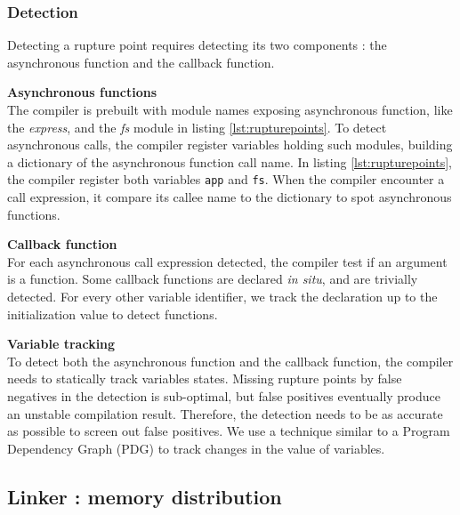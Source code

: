 \subsubsection{Detection}

Detecting a rupture point requires detecting its two components : the asynchronous function and the callback function.

\textbf{Asynchronous functions}\\
The compiler is prebuilt with module names exposing asynchronous function, like the \textit{express}, and the \textit{fs} module in listing \ref{lst:rupturepoints}.
To detect asynchronous calls, the compiler register variables holding such modules, building a dictionary of the asynchronous function call name.
In listing \ref{lst:rupturepoints}, the compiler register both variables \texttt{app} and \texttt{fs}.
When the compiler encounter a call expression, it compare its callee name to the dictionary to spot asynchronous functions.

\textbf{Callback function}\\
For each asynchronous call expression detected, the compiler test if an argument is a function.
Some callback functions are declared \textit{in situ}, and are trivially detected.
For every other variable identifier, we track the declaration up to the initialization value to detect functions.

\textbf{Variable tracking}\\
To detect both the asynchronous function and the callback function, the compiler needs to statically track variables states.
Missing rupture points by false negatives in the detection is sub-optimal, but false positives eventually produce an unstable compilation result.
Therefore, the detection needs to be as accurate as possible to screen out false positives.
We use a technique similar to a Program Dependency Graph (PDG)\cite{Ferrante1987} to track changes in the value of variables.


\subsection{Linker : memory distribution} \label{section:linker}

